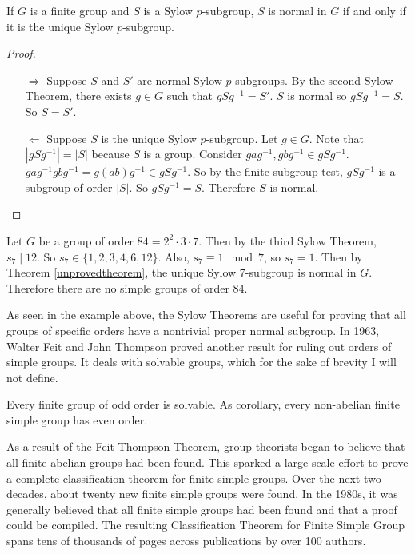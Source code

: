 \documentclass[a4paper]{article}
\begin{document}
\begin{theorem}
\label{unprovedtheorem}
If $G$ is a finite group and $S$ is a Sylow $p$-subgroup, $S$ is normal in $G$ if and only if it is the unique Sylow $p$-subgroup.
\end{theorem}
\begin{proof}~
\begin{enumerate}
\item[$\Rightarrow$]
Suppose $S$ and $S'$ are normal Sylow $p$-subgroups. By the second Sylow Theorem, there exists $g \in G$ such that $g S g^{-1} = S'$. $S$ is normal so $g S g^{-1} = S$. So $S = S'$.
\item[$\Leftarrow$]
Suppose $S$ is the unique Sylow $p$-subgroup. Let $g \in G$. Note that $|g S g^{-1}| = |S|$ because $S$ is a group. Consider $g a g^{-1}, g b g^{-1} \in g S g^{-1}$. $g a g^{-1} g b g^{-1} = g (a b) g^{-1} \in g S g^{-1}$. So by the finite subgroup test, $g S g^{-1}$ is a subgroup of order $|S|$. So $g S g^{-1} = S$. Therefore $S$ is normal.
\end{enumerate}
\end{proof}

\begin{example}
Let $G$ be a group of order $84 = 2^2 \cdot 3 \cdot 7$. Then by the third Sylow Theorem, $s_7 \mid 12$. So $s_7 \in \{1, 2, 3, 4, 6, 12\}$. Also, $s_7 \equiv 1 \mod 7$, so $s_7 = 1$. Then by Theorem \ref{unprovedtheorem}, the unique Sylow 7-subgroup is normal in $G$. Therefore there are no simple groups of order 84.
\end{example}

As seen in the example above, the Sylow Theorems are useful for proving that all groups of specific orders have a nontrivial proper normal subgroup. In 1963, Walter Feit and John Thompson proved another result for ruling out orders of simple groups. It deals with solvable groups, which for the sake of brevity I will not define.

\begin{theorem}
Every finite group of odd order is solvable. As corollary, every non-abelian finite simple group has even order.
\end{theorem}

As a result of the Feit-Thompson Theorem, group theorists began to believe that all finite abelian groups had been found. This sparked a large-scale effort to prove a complete classification theorem for finite simple groups. Over the next two decades, about twenty new finite simple groups were found. In the 1980s, it was generally believed that all finite simple groups had been found and that a proof could be compiled. The resulting Classification Theorem for Finite Simple Group spans tens of thousands of pages across publications by over 100 authors.
\end{document}
